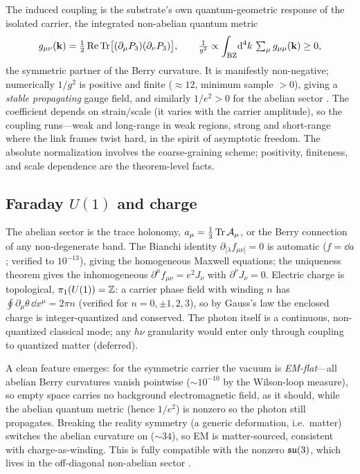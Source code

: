 The induced coupling is the substrate's own quantum-geometric response of the isolated carrier,
the integrated non-abelian quantum metric \citep{ProvostVallee1980,XiaoChangNiu2010}
\begin{equation}
  g_{\mu\nu}(\mathbf{k})=\tfrac12\operatorname{Re}\operatorname{Tr}\bigl[(\partial_\mu P_3)(\partial_\nu P_3)\bigr],
  \qquad \tfrac{1}{g^2}\propto\int_{\text{BZ}}\!\mathrm{d}^4k\,\textstyle\sum_\mu g_{\mu\mu}(\mathbf{k})\ge 0,
\end{equation}
the symmetric partner of the Berry curvature. It is manifestly non-negative; numerically
$1/g^2$ is positive and finite ($\approx 12$, minimum sample $>0$), giving a \emph{stable
propagating} gauge field, and similarly $1/e^2>0$ for the abelian sector \citep{repo}. The
coefficient depends on strain/scale (it varies with the carrier amplitude), so the coupling
runs---weak and long-range in weak regions, strong and short-range where the link frames twist
hard, in the spirit of asymptotic freedom. The absolute normalization involves the
coarse-graining scheme; positivity, finiteness, and scale dependence are the theorem-level facts.

\subsection{Faraday $U(1)$ and charge}
\label{subsec:u1}

The abelian sector is the trace holonomy, $a_\mu=\tfrac13\operatorname{Tr}\mathcal{A}_\mu$, or the Berry connection of
any non-degenerate band. The Bianchi identity $\partial_{[\lambda}f_{\mu\nu]}=0$ is automatic
($f=\dd a$; verified to $10^{-13}$), giving the homogeneous Maxwell equations; the uniqueness
theorem gives the inhomogeneous $\partial^\mu f_{\mu\nu}=e^2 J_\nu$ with $\partial^\nu J_\nu=0$.
Electric charge is topological, $\pi_1(U(1))=\mathbb{Z}$: a carrier phase field with winding $n$ has
$\oint\partial_\mu\theta\,\dd x^\mu=2\pi n$ (verified for $n=0,\pm1,2,3$), so by Gauss's law the
enclosed charge is integer-quantized and conserved. The photon itself is a continuous,
non-quantized classical mode; any $h\nu$ granularity would enter only through coupling to
quantized matter (deferred).

A clean feature emerges: for the symmetric carrier the vacuum is \emph{EM-flat}---all abelian
Berry curvatures vanish pointwise ($\sim10^{-10}$ by the Wilson-loop measure), so empty space
carries no background electromagnetic field, as it should, while the abelian quantum metric
(hence $1/e^2$) is nonzero so the photon still propagates. Breaking the reality symmetry (a
generic deformation, i.e.\ matter) switches the abelian curvature on ($\sim 34$), so EM is
matter-sourced, consistent with charge-as-winding. This is fully compatible with the nonzero
$\mathfrak{su}(3)$, which lives in the off-diagonal non-abelian sector \citep{repo}.

